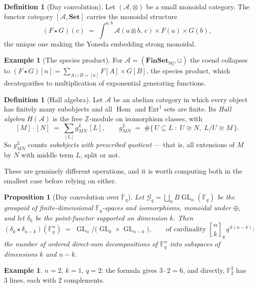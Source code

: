 \documentclass[11pt,a4paper]{article}
\newtheorem{proposition}[theorem]{Proposition}
\theoremstyle{definition}
\newtheorem{definition}[theorem]{Definition}
\newtheorem{example}[theorem]{Example}
\theoremstyle{remark}
\newcommand{\FF}{\mathbb{F}}
\newcommand{\ZZ}{\mathbb{Z}}
\newcommand{\cat}[1]{\mathbf{#1}}
\newcommand{\Set}{\cat{Set}}
\newcommand{\FinSet}{\cat{FinSet}}
\DeclareMathOperator{\Hom}{Hom}
\DeclareMathOperator{\GL}{GL}
\newcommand{\qbin}[2]{\genfrac{[}{]}{0pt}{}{#1}{#2}_{q}}
\begin{document}
\begin{definition}[Day convolution]\label{def:day}
Let $(\mathcal{A}, \otimes)$ be a small monoidal category. The functor category
$[\mathcal{A}, \Set]$ carries the monoidal structure
\[
  (F \star G)(c) \;=\; \int^{a,b} \mathcal{A}(a \otimes b,\, c) \times F(a) \times G(b),
\]
the unique one making the Yoneda embedding strong monoidal.
\end{definition}

\begin{example}[The species product]
For $\mathcal{A} = (\FinSet_{\mathrm{bij}}, \sqcup)$ the coend collapses to
$(F \star G)[n] = \sum_{A \sqcup B = [n]} F[A] \times G[B]$, the species product,
which decategorifies to multiplication of exponential generating functions.
\end{example}

\begin{definition}[Hall algebra]\label{def:hall}
Let $\mathcal{A}$ be an abelian category in which every object has finitely many
subobjects and all $\Hom$ and $\mathrm{Ext}^1$ sets are finite. Its \emph{Hall
algebra} $H(\mathcal{A})$ is the free $\ZZ$-module on isomorphism classes, with
\[
  [M]\cdot[N] \;=\; \sum_{[L]} g^{L}_{MN}\,[L],
  \qquad
  g^{L}_{MN} \;=\; \#\bigl\{\, U \subseteq L \;:\; U \cong N,\; L/U \cong M \,\bigr\}.
\]
So $g^{L}_{MN}$ counts \emph{subobjects with prescribed quotient} --- that is, all
extensions of $M$ by $N$ with middle term $L$, split or not.
\end{definition}

These are genuinely different operations, and it is worth computing both in the
smallest case before relying on either.

\begin{proposition}[Day convolution over $\FF_q$]\label{prop:day}
Let $\mathcal{G}_q = \bigsqcup_n B\GL_n(\FF_q)$ be the groupoid of
finite-dimensional $\FF_q$-spaces and isomorphisms, monoidal under $\oplus$, and
let $\delta_k$ be the point-functor supported on dimension $k$. Then
\[
  (\delta_k \star \delta_{n-k})(\FF_q^{n})
  \;=\; \GL_n \big/ \bigl(\GL_k \times \GL_{n-k}\bigr),
  \qquad
  \text{of cardinality } \qbin{n}{k}\, q^{\,k(n-k)} :
\]
the number of \emph{ordered direct-sum decompositions} of $\FF_q^{n}$ into
subspaces of dimensions $k$ and $n-k$.
\end{proposition}

\begin{example}
$n = 2$, $k = 1$, $q = 2$: the formula gives $3 \cdot 2 = 6$, and directly,
$\FF_2^{2}$ has $3$ lines, each with $2$ complements.
\end{example}
\end{document}
